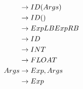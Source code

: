 \begin{alignat*}{8}
                &\rightarrow \space ID \space ( \space Args \space )\\
                &\rightarrow \space ID \space ( \space )\\
                &\rightarrow \space Exp \space LB \space Exp \space RB\\
                &\rightarrow \space ID\\
                &\rightarrow \space INT\\
                &\rightarrow \space FLOAT\\
    Args        &\rightarrow \space Exp \space , \space Args\\
                &\rightarrow \space Exp\\
    \end{alignat*}
